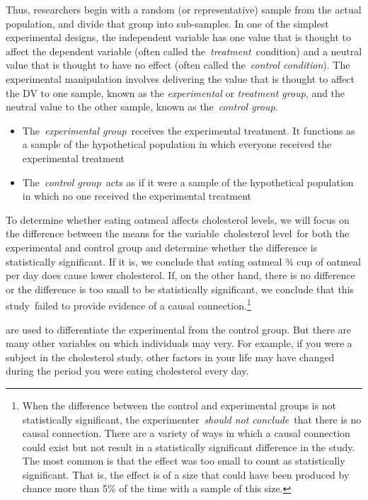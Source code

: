 \begin{refsection}
Thus, researchers begin with a random (or representative) sample from the actual population, and divide that group into sub-samples. In one of the simplest experimental designs, the independent variable has one value that is thought to affect the dependent variable (often called the \emph{treatment} condition) and a neutral value that is thought to have no effect (often called the \emph{control condition}). The experimental manipulation involves delivering the value that is thought to affect the DV to one sample, known as the \emph{experimental} or \emph{treatment group}, and the neutral value to the other sample, known as the \emph{control group}.

\begin{itemize}
\item The \emph{experimental group} receives the experimental treatment. It functions as a sample of the hypothetical population in which everyone received the experimental treatment

\item The \emph{control group} acts as if it were a sample of the hypothetical population in which no one received the experimental treatment

\end{itemize}

To determine whether eating oatmeal affects cholesterol levels, we will focus on the difference between the means for the variable cholesterol level for both the experimental and control group and determine whether the difference is statistically significant. If it is, we conclude that eating oatmeal ¾ cup of oatmeal per day does cause lower cholesterol. If, on the other hand, there is no difference or the difference is too small to be statistically significant, we conclude that this study failed to provide evidence of a causal connection.\footnote{When the difference between the control and experimental groups is not statistically significant, the experimenter \emph{should not conclude} that there is no causal connection. There are a variety of ways in which a causal connection could exist but not result in a statistically significant difference in the study. The most common is that the effect was too small to count as statistically significant. That is, the effect is of a size that could have been produced by chance more than 5\% of the time with a sample of this size.}

 are used to differentiate the experimental from the control group. But there are many other variables on which individuals may very. For example, if you were a subject in the cholesterol study, other factors in your life may have changed during the period you were eating cholesterol every day. 


\end{refsection}
